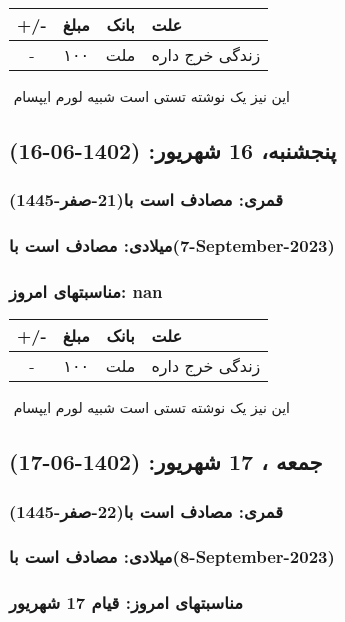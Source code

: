 \documentclass{article}
\newcommand{\rnote}[1]{\marginpar{\textcolor{color}{\StrSubstitute{\##1}{ }{\_}}}}
\newcommand{\myRow}[4]{
    #1 & #2 & #3 & #4 \\ \hline
}
\begin{document}
\begin{tabular}{ | c | c | c | p{5cm} |}
    \hline
    \myRow{ +/- }{مبلغ}{بانک}{علت}
    \myRow{-}{۱۰۰}{ملت}{زندگی خرج داره}
\end{tabular}
\newline
\newline

‌
\rnote{تست}
این نیز یک نوشته تستی است شبیه لورم ایپسام




\newpage
{}
\textcolor{color}{
\section{ پنجشنبه، 16 شهریور: (1402-06-16) }
\subsubsection*{قمری: مصادف است با(21-صفر-1445)} 
\subsubsection*{میلادی: مصادف است با(7-September-2023)}
\subsubsection*{مناسبتهای امروز: nan}
}


\begin{tabular}{ | c | c | c | p{5cm} |}
    \hline
    \myRow{ +/- }{مبلغ}{بانک}{علت}
    \myRow{-}{۱۰۰}{ملت}{زندگی خرج داره}
\end{tabular}
\newline
\newline

‌
\rnote{تست}
این نیز یک نوشته تستی است شبیه لورم ایپسام




\newpage
{}
\textcolor{color}{
\section{ جمعه ، 17 شهریور: (1402-06-17) }
\subsubsection*{قمری: مصادف است با(22-صفر-1445)} 
\subsubsection*{میلادی: مصادف است با(8-September-2023)}
\subsubsection*{مناسبتهای امروز: قیام 17 شهریور}
}
\end{document}
